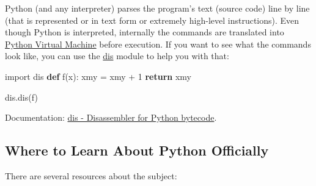 \documentclass[
]{article}
\newenvironment{Shaded}{}{}
\newcommand{\ControlFlowTok}[1]{\textcolor[rgb]{0.00,0.44,0.13}{\textbf{#1}}}
\newcommand{\DecValTok}[1]{\textcolor[rgb]{0.25,0.63,0.44}{#1}}
\newcommand{\ImportTok}[1]{#1}
\newcommand{\KeywordTok}[1]{\textcolor[rgb]{0.00,0.44,0.13}{\textbf{#1}}}
\newcommand{\NormalTok}[1]{#1}
\newcommand{\OperatorTok}[1]{\textcolor[rgb]{0.40,0.40,0.40}{#1}}
\begin{document}
Python (and any interpreter) parses the program's text (source code)
line by line (that is represented or in text form or extremely
high-level instructions). Even though Python is interpreted, internally
the commands are translated into
\href{https://docs.python.org/3/glossary.html\#term-virtual-machine}{Python
Virtual Machine} before execution. If you want to see what the commands
look like, you can use the
\href{https://docs.python.org/3/library/dis.html\#module-dis}{dis}
module to help you with that:

\begin{Shaded}
\begin{Highlighting}[]
\ImportTok{import}\NormalTok{ dis}
\KeywordTok{def}\NormalTok{ f(x):}
\NormalTok{    xmy }\OperatorTok{=}\NormalTok{ xmy }\OperatorTok{+} \DecValTok{1}
    \ControlFlowTok{return}\NormalTok{ xmy}

\NormalTok{dis.dis(f)}
\end{Highlighting}
\end{Shaded}

Documentation:
\href{https://docs.python.org/3/library/dis.html?highlight=dis\#module-dis}{dis
- Disassembler for Python bytecode}.

\hypertarget{where-to-learn-about-python-officially}{%
\subsection{Where to Learn About Python
Officially}\label{where-to-learn-about-python-officially}}

There are several resources about the subject:
\end{document}
